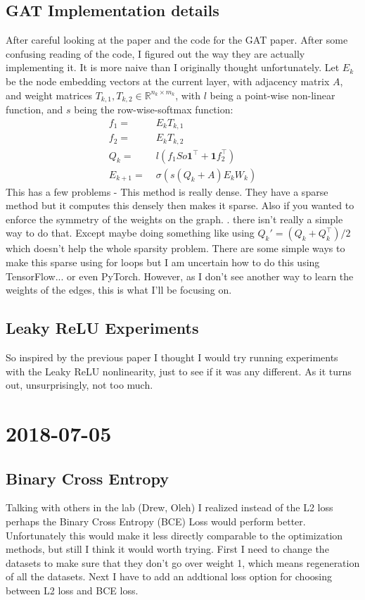 \documentclass[a4paper]{article}
\newcommand{\DatestampYMD}[3]{\mbox{#1-#2-#3}}
\newcommand{\entry}[3]{\newpage\section*{\DatestampYMD{#1}{#2}{#3}} }
\begin{document}
\subsection*{GAT Implementation details}
After careful looking at the paper and the code for the GAT paper.
After some confusing reading of the code, I figured out the way they are actually implementing it.
It is more naive than I originally thought unfortunately.
Let $E_k$ be the node embedding vectors at the current layer, with adjacency matrix $A$, and weight matrices $T_{k,1}, T_{k,2} \in \mathbb{R}^{n_k \times m_k}$, with $l$ being a point-wise non-linear function, and $s$ being the row-wise-softmax function:
\begin{align*}
f_1 =&\; E_k T_{k,1} \\
f_2 =&\; E_k T_{k,2} \\
Q_k =&\; l(f_1 So \mathbf{1}^\top + \mathbf{1} f_2^\top) \\
E_{k+1} =&\; \sigma \left( s(Q_k + A) E_k W_k \right)
\end{align*}
This has a few problems - This method is really dense.
They have a sparse method but it computes this densely then makes it sparse.
Also if you wanted to enforce the symmetry of the weights on the graph.
. there isn't really a simple way to do that.
Except maybe doing something like using $Q_k' = (Q_k + Q_k^\top)/2$ which doesn't help the whole sparsity problem.
There are some simple ways to make this sparse using for loops but I am uncertain how to do this using TensorFlow... or even PyTorch.
However, as I don't see another way to learn the weights of the edges, this is what I'll be focusing on. 

\subsection*{Leaky ReLU Experiments}
So inspired by the previous paper I thought I would try running experiments with the Leaky ReLU nonlinearity, just to see if it was any different.
As it turns out, unsurprisingly, not too much.

\entry{2018}{07}{05}
\subsection*{Binary Cross Entropy}
Talking with others in the lab (Drew, Oleh) I realized instead of the L2 loss perhaps the Binary Cross Entropy (BCE) Loss would perform better.
Unfortunately this would make it less directly comparable to the optimization methods, but still I think it would worth trying.
First I need to change the datasets to make sure that they don't go over weight 1, which means regeneration of all the datasets.
Next I have to add an addtional loss option for choosing between L2 loss and BCE loss.
\end{document}

